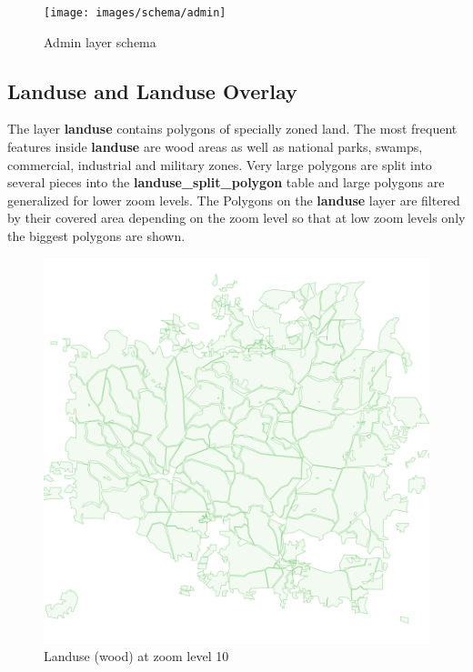 \vspace{20}

\begin{figure}[H]
  \centering
  \texttt{[image: images/schema/admin]}
  \caption{Admin layer schema}
\end{figure}

\subsection{Landuse and Landuse Overlay}

\noindent\begin{minipage}[t]{0.48\linewidth}
    \vspace{0pt}
    The layer \textbf{landuse} contains polygons of specially zoned land. The most frequent 
    features inside \textbf{landuse} are wood areas as well as national parks, swamps, commercial, industrial and military zones.
    Very large polygons are split into several pieces into the \textbf{landuse\_split\_polygon} table and large polygons are generalized
    for lower zoom levels. The Polygons on the \textbf{landuse} layer are filtered by their covered area depending on the zoom level so that at low zoom levels only the biggest polygons are shown.
\end{minipage}
\hfill
\begin{minipage}[t]{0.48\linewidth}
    \vspace{-20pt}
    \begin{figure}[H]
      \includegraphics[width=1\textwidth]{images/schema/landuse_example}
      \caption{Landuse (wood) at zoom level 10}
    \end{figure}
\end{minipage}

